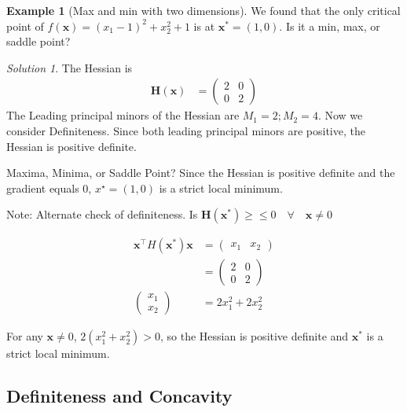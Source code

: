 \documentclass[
]{book}
\theoremstyle{definition}
\theoremstyle{definition}
\newtheorem{example}{Example}[chapter]
\theoremstyle{definition}
\theoremstyle{remark}
\newtheorem*{solution}{Solution}
\begin{document}
\begin{example}[Max and min with two dimensions]
\protect\hypertarget{exm:unnamed-chunk-57}{}{\label{exm:unnamed-chunk-57} {} }
We found that the only critical point of
\(f(\mathbf{x})=(x_1-1)^2+x_2^2+1\) is at \(\mathbf{x}^*=(1,0)\). Is it a min, max, or
saddle point?
\end{example}

\begin{solution}
{}
The Hessian is
\begin{align*}
\mathbf{H(x)} &= \begin{pmatrix} 2&0\\0&2 \end{pmatrix}
\end{align*}
The Leading principal minors of the Hessian are \(M_1=2; M_2=4\). Now we consider Definiteness. Since both leading principal minors are positive, the Hessian is positive definite.

Maxima, Minima, or Saddle Point? Since the Hessian is positive definite and the gradient equals 0, \(x^\star = (1,0)\) is a strict local minimum.

Note: Alternate check of definiteness. Is \(\mathbf{H(x^*)} \geq \leq 0 \quad \forall \quad \mathbf{x}\ne 0\)

\begin{align*}
\mathbf{x}^\top H(\mathbf{x}^*) \mathbf{x} &= \begin{pmatrix} x_1 & x_2 \end{pmatrix}\\
&= \begin{pmatrix} 2&0\\0&2 \end{pmatrix}\\
\begin{pmatrix} x_1\\x_2\end{pmatrix} &= 2x_1^2+2x_2^2
\end{align*}

For any \(\mathbf{x}\ne 0\), \(2(x_1^2+x_2^2)>0\), so the Hessian is positive definite and \(\mathbf{x}^*\) is a strict local minimum.
\end{solution}

\hypertarget{definiteness-and-concavity}{%
\subsection*{Definiteness and Concavity}\label{definiteness-and-concavity}}
\end{document}
